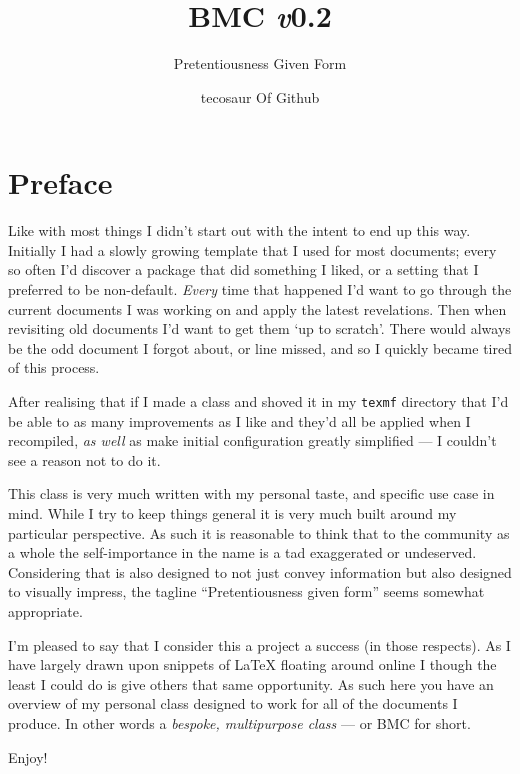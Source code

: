 \documentclass[solid,math,chem,code,plot]{bmc}
\title{\texorpdfstring{BMC \hfill \fontsize{1.35cm}{1.35cm}\fontseries{t}\selectfont \emph{v}0.2}{BMC v0.2}}
\subtitle{Pretentiousness Given Form}
\author{tecosaur \footnotesize \newline Of Github}
\begin{document}
\maketitle

\section*{Preface}

\vspace{1cm}

Like with most things I didn't start out with the intent to end up this way.
Initially I had a slowly growing template that I used for most documents;
every so often I'd discover a package that did something I liked,
or a setting that I preferred to be non-default.
\emph{Every} time that happened I'd want to go through the current documents I was working on
and apply the latest revelations.
Then when revisiting old documents I'd want to get them `up to scratch'.
There would always be the odd document I forgot about, or line missed,
and so I quickly became tired of this process.

After realising that if I made a class and shoved it in my \verb|texmf|
directory that I'd be able to as many improvements as I like and they'd all
be applied when I recompiled, \emph{as well} as make initial configuration
greatly simplified --- I couldn't see a reason not to do it.

This class is very much written with my personal taste, and specific use case in mind.
While I try to keep things general it is very much built around my particular perspective.
As such it is reasonable to think that to the community as a whole the
self-importance in the name is a tad exaggerated or undeserved.
Considering that is also designed to not just convey information but also
designed to visually impress, the tagline ``Pretentiousness given form''
seems somewhat appropriate.

I'm pleased to say that I consider this a project a success (in those respects).
As I have largely drawn upon snippets of LaTeX floating around online
I though the least I could do is give others that same opportunity.
As such here you have an overview of my personal class
designed to work for all of the documents I produce.
In other words a \emph{bespoke, multipurpose class} --- or BMC for short.

\vspace{1cm}

Enjoy!
\end{document}
